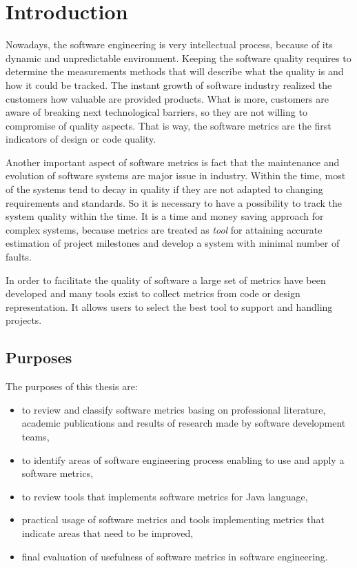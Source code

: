 \chapter{Introduction} \label{roz:wstep}
Nowadays, the software engineering is very intellectual process, because of its dynamic and unpredictable environment. Keeping the software quality requires to determine the measurements methods that will describe what the quality is and how it could be tracked.  The instant growth of software industry realized the customers how valuable are provided products. What is more, customers are aware of breaking next technological barriers, so they are not willing to compromise of quality aspects. That is way, the software metrics are the first indicators of design or code quality.
 
Another important aspect of software metrics is fact that the maintenance and evolution of software systems are major issue in industry. Within the time, most of the systems tend to decay in quality if they are not adapted to changing requirements and standards. So it is necessary to have a possibility to track the system quality within the time. It is a time and money saving approach for complex systems, because metrics are treated as \textit{tool} for attaining accurate estimation of project milestones and develop a system with minimal number of faults. 
 
In order to facilitate the quality of software a large set of metrics have been developed and many tools exist to collect metrics from code or design representation. It allows users to select the best tool to support and handling projects.

\section{Purposes}
The purposes of this thesis are:

\begin{itemize}
\item to review and classify software metrics basing on professional literature, academic publications and results of research made by software development teams, 
\item to identify areas of software engineering process enabling to use and apply a software metrics,
\item to review tools that implements software metrics for Java language,
\item practical usage of software metrics and tools implementing metrics that indicate areas that need to be improved, 
\item final evaluation of usefulness of software metrics in software engineering. 
\end{itemize}


